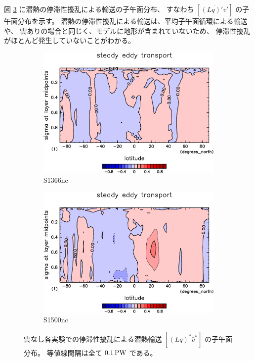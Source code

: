 \documentclass[body]{subfiles}
\begin{document}
図 \ref{潜熱停滞性擾乱nc} に潜熱の停滞性擾乱による輸送の子午面分布、
すなわち \([\overline{(Lq)'v'}]\) の子午面分布を示す。
潜熱の停滞性擾乱による輸送は、平均子午面循環による輸送や、
雲ありの場合と同じく、モデルに地形が含まれていないため、
停滞性擾乱がほとんど発生していないことがわかる。

\begin{figure}[t]
	\centering
	\begin{subfigure}{.4\textwidth}
		\centering
		\includegraphics[width=\columnwidth]{S1366-nc/MeriHeatTransTest@latentEn_SE,time=3650:4015-crop-rotate.pdf}
		\caption{S1366nc}\label{潜熱停滞性擾乱S1366nc}
	\end{subfigure}
	\begin{subfigure}{.4\textwidth}
		\centering
		\includegraphics[width=\columnwidth]{S1500-nc/MeriHeatTransTest@latentEn_SE,time=3650:4015-crop-rotate.pdf}
		\caption{S1500nc}\label{潜熱停滞性擾乱S1500nc}
	\end{subfigure}
	\caption[雲なし各実験でのに停滞性擾乱による潜熱輸送の子午面分布]{
		雲なし各実験での停滞性擾乱による潜熱輸送 \([\overline{(Lq)^*}\bar v^*]\) の子午面分布。
		等値線間隔は全て \(0.1\hmu{PW}\) である。
	}\label{潜熱停滞性擾乱nc}
\end{figure}
\end{document}
